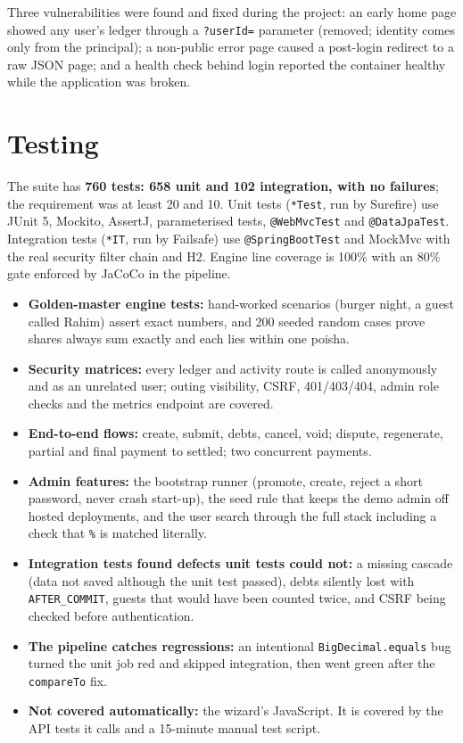 \documentclass[10pt,a4paper]{article}
\newcommand{\code}[1]{\texttt{#1}}
\begin{document}
Three vulnerabilities were found and fixed during the project: an early home page showed any user's ledger through a
\code{?userId=} parameter (removed; identity comes only from the principal); a non-public error page caused a
post-login redirect to a raw JSON page; and a health check behind login reported the container healthy while the
application was broken.

\section{Testing}

The suite has \textbf{760 tests: 658 unit and 102 integration, with no failures}; the requirement was at least 20 and
10. Unit tests (\code{*Test}, run by Surefire) use JUnit 5, Mockito, AssertJ, parameterised tests, \code{@WebMvcTest}
and \code{@DataJpaTest}. Integration tests (\code{*IT}, run by Failsafe) use \code{@SpringBootTest} and MockMvc with the
real security filter chain and H2. Engine line coverage is 100\% with an 80\% gate enforced by JaCoCo in the pipeline.

\begin{itemize}
\item \textbf{Golden-master engine tests:} hand-worked scenarios (burger night, a guest called Rahim) assert exact
  numbers, and 200 seeded random cases prove shares always sum exactly and each lies within one poisha.
\item \textbf{Security matrices:} every ledger and activity route is called anonymously and as an unrelated user;
  outing visibility, CSRF, 401/403/404, admin role checks and the metrics endpoint are covered.
\item \textbf{End-to-end flows:} create, submit, debts, cancel, void; dispute, regenerate, partial and final payment
  to settled; two concurrent payments.
\item \textbf{Admin features:} the bootstrap runner (promote, create, reject a short password, never crash start-up),
  the seed rule that keeps the demo admin off hosted deployments, and the user search through the full stack
  including a check that \code{\%} is matched literally.
\item \textbf{Integration tests found defects unit tests could not:} a missing cascade (data not saved although the
  unit test passed), debts silently lost with \code{AFTER\_COMMIT}, guests that would have been counted twice, and CSRF
  being checked before authentication.
\item \textbf{The pipeline catches regressions:} an intentional \code{BigDecimal.equals} bug turned the unit job red
  and skipped integration, then went green after the \code{compareTo} fix.
\item \textbf{Not covered automatically:} the wizard's JavaScript. It is covered by the API tests it calls and a
  15-minute manual test script.
\end{itemize}
\end{document}
